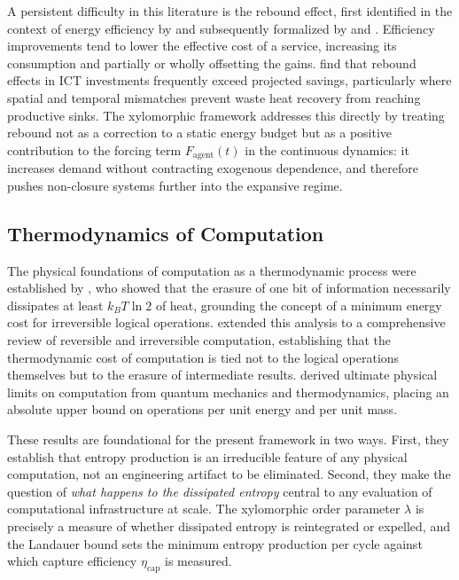 \documentclass[11pt,a4paper]{article}
\theoremstyle{plain}
\theoremstyle{definition}
\theoremstyle{remark}
\begin{document}
A persistent difficulty in this literature is the rebound effect, first
identified in the context of energy efficiency by \citet{jevons1865} and
subsequently formalized by \citet{brookes1990} and \citet{sorrell2009}.
Efficiency improvements tend to lower the effective cost of a service,
increasing its consumption and partially or wholly offsetting the gains.
\citet{jones2021} find that rebound effects in ICT investments frequently
exceed projected savings, particularly where spatial and temporal mismatches
prevent waste heat recovery from reaching productive sinks. The xylomorphic
framework addresses this directly by treating rebound not as a correction to a
static energy budget but as a positive contribution to the forcing term
$F_{\mathrm{agent}}(t)$ in the continuous dynamics: it increases demand without
contracting exogenous dependence, and therefore pushes non-closure systems
further into the expansive regime.

\subsection{Thermodynamics of Computation}

The physical foundations of computation as a thermodynamic process were
established by \citet{landauer1961}, who showed that the erasure of one bit of
information necessarily dissipates at least $k_B T \ln 2$ of heat, grounding
the concept of a minimum energy cost for irreversible logical operations.
\citet{bennett1982} extended this analysis to a comprehensive review of
reversible and irreversible computation, establishing that the thermodynamic
cost of computation is tied not to the logical operations themselves but to the
erasure of intermediate results. \citet{lloyd2000} derived ultimate physical
limits on computation from quantum mechanics and thermodynamics, placing an
absolute upper bound on operations per unit energy and per unit mass.

These results are foundational for the present framework in two ways. First,
they establish that entropy production is an irreducible feature of any physical
computation, not an engineering artifact to be eliminated. Second, they make
the question of \emph{what happens to the dissipated entropy} central to any
evaluation of computational infrastructure at scale. The xylomorphic order
parameter $\lambda$ is precisely a measure of whether dissipated entropy is
reintegrated or expelled, and the Landauer bound sets the minimum entropy
production per cycle against which capture efficiency $\eta_{\mathrm{cap}}$ is
measured.
\end{document}
